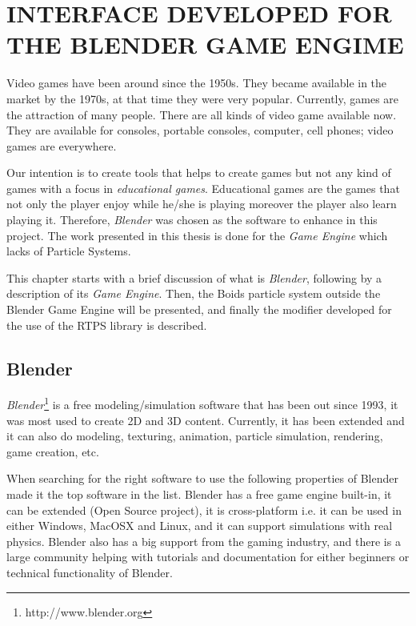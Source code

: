 \chapter{INTERFACE DEVELOPED FOR THE BLENDER GAME ENGIME}\label{chap5}


Video games have been around since the 1950s\cite{historyVideoGames}. They became available in the market by the 1970s, at that time they were very popular. Currently, games are the attraction of many people. There are all kinds of video game available now. They are available for consoles, portable consoles, computer, cell phones; video games are everywhere. 

Our intention is to create tools that helps to create games but not any kind of games with a focus in \textit{educational games}. Educational games are the games that not only the player enjoy while he/she is playing moreover the player also learn playing it. Therefore, \textit{Blender} was chosen as the software to enhance in this project. The work presented in this thesis is done for the \textit{Game Engine} which lacks of Particle Systems.

This chapter starts with a brief discussion of what is \textit{Blender}, following by a description of its \textit{Game Engine}. Then, the Boids particle system outside the Blender Game Engine will be presented, and finally the modifier developed for the use of the RTPS library is described.

\section{Blender}\label{blenderSec}
\textit{Blender}\footnote{http://www.blender.org} is a free modeling/simulation software that has been out since 1993, it was most used to create 2D and 3D content. Currently, it has been extended and it can also do modeling, texturing, animation, particle simulation, rendering, game creation, etc.

When searching for the right software to use the following properties of Blender made it the top software in the list. Blender has a free game engine built-in, it can be extended (Open Source project), it is cross-platform i.e. it can be used in either Windows, MacOSX and Linux, and it can support simulations with real physics. Blender also has a big support from the gaming industry, and there is a large community helping with tutorials and documentation for either beginners or technical functionality of Blender.

